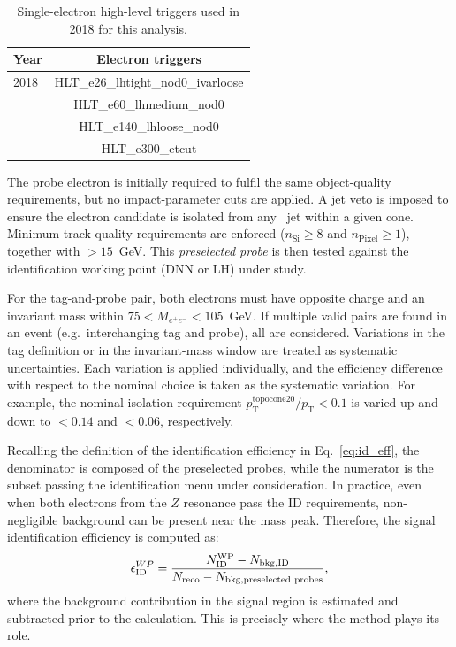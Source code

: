 \begin{table}[htbp]
  \small 
  \centering
  \begin{tabular}{lc}
  \hline
  \textbf{Year} & \textbf{Electron triggers} \\
  \hline
  2018 & HLT\_e26\_lhtight\_nod0\_ivarloose \\
       & HLT\_e60\_lhmedium\_nod0 \\
       & HLT\_e140\_lhloose\_nod0 \\
       & HLT\_e300\_etcut \\
  \hline
  \end{tabular}
  \caption{Single-electron high-level triggers used in 2018 for this analysis.}
  \label{tab:electron_triggers_2018}
\end{table}

The probe electron is initially required to fulfil the same object-quality requirements, but no impact-parameter cuts are applied. A jet veto is imposed to ensure the electron candidate is isolated from any \antikt\ jet within a given cone. Minimum track-quality requirements are enforced ($n_{\mathrm{Si}} \ge 8$ and $n_{\mathrm{Pixel}} \ge 1$), together with \et$>15$~GeV. This \textit{preselected probe} is then tested against the identification working point (DNN or LH) under study.

For the tag-and-probe pair, both electrons must have opposite charge and an invariant mass within $75 < M_{e^+e^-} < 105$~GeV. If multiple valid pairs are found in an event (e.g.\ interchanging tag and probe), all are considered. Variations in the tag definition or in the invariant-mass window are treated as systematic uncertainties. Each variation is applied individually, and the efficiency difference with respect to the nominal choice is taken as the systematic variation. For example, the nominal isolation requirement $p_{\mathrm{T}}^{\mathrm{topocone20}}/p_{\mathrm{T}}<0.1$ is varied up and down to $<0.14$ and $<0.06$, respectively.

Recalling the definition of the identification efficiency in Eq.~\ref{eq:id_eff}, the denominator is composed of the preselected probes, while the numerator is the subset passing the identification menu under consideration. In practice, even when both electrons from the $Z$ resonance pass the ID requirements, non-negligible background can be present near the mass peak. Therefore, the signal identification efficiency is computed as:
\begin{equation}
  \small 
  \epsilon^{WP}_{\mathrm{ID}} = \frac{N^{\mathrm{WP}}_{\mathrm{ID}} - N_{\mathrm{bkg,ID}}}{N_{\mathrm{reco}} - N_{\mathrm{bkg,preselected\ probes}}},
\label{eq:id_eff}  
\end{equation}
where the background contribution in the signal region is estimated and subtracted prior to the calculation. This is precisely where the \zmass method plays its role.

